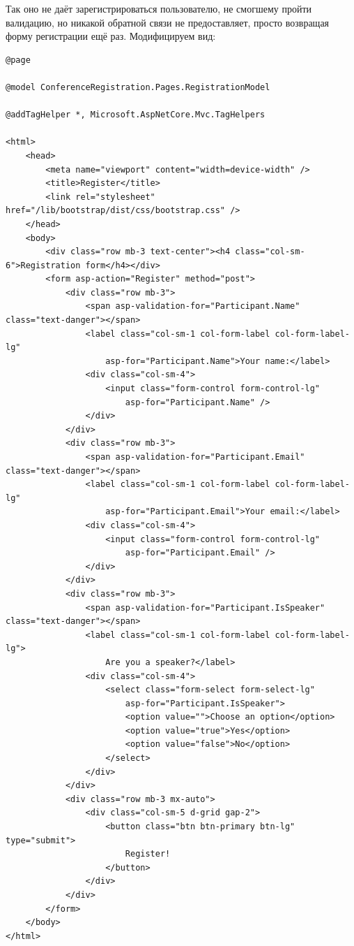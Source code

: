 \documentclass{../../text-style}
\begin{document}
Так оно не даёт зарегистрироваться пользователю, не смогшему пройти валидацию, но никакой обратной связи не предоставляет, просто возвращая форму регистрации ещё раз. Модифицируем вид:

\begin{verbatim}
@page

@model ConferenceRegistration.Pages.RegistrationModel

@addTagHelper *, Microsoft.AspNetCore.Mvc.TagHelpers

<html>
    <head>
        <meta name="viewport" content="width=device-width" />
        <title>Register</title>
        <link rel="stylesheet" href="/lib/bootstrap/dist/css/bootstrap.css" />
    </head>
    <body>
        <div class="row mb-3 text-center"><h4 class="col-sm-6">Registration form</h4></div>
        <form asp-action="Register" method="post">
            <div class="row mb-3">
                <span asp-validation-for="Participant.Name" class="text-danger"></span>
                <label class="col-sm-1 col-form-label col-form-label-lg" 
                    asp-for="Participant.Name">Your name:</label>
                <div class="col-sm-4">
                    <input class="form-control form-control-lg" 
                        asp-for="Participant.Name" />
                </div>
            </div>
            <div class="row mb-3">
                <span asp-validation-for="Participant.Email" class="text-danger"></span>
                <label class="col-sm-1 col-form-label col-form-label-lg" 
                    asp-for="Participant.Email">Your email:</label>
                <div class="col-sm-4">
                    <input class="form-control form-control-lg" 
                        asp-for="Participant.Email" />
                </div>
            </div>
            <div class="row mb-3">
                <span asp-validation-for="Participant.IsSpeaker" class="text-danger"></span>
                <label class="col-sm-1 col-form-label col-form-label-lg">
                    Are you a speaker?</label>
                <div class="col-sm-4">
                    <select class="form-select form-select-lg" 
                        asp-for="Participant.IsSpeaker">
                        <option value="">Choose an option</option>
                        <option value="true">Yes</option>
                        <option value="false">No</option>
                    </select>
                </div>
            </div>
            <div class="row mb-3 mx-auto">
                <div class="col-sm-5 d-grid gap-2">
                    <button class="btn btn-primary btn-lg" type="submit">
                        Register!
                    </button>
                </div>
            </div>
        </form>
    </body>
</html>
\end{verbatim}
\end{document}
